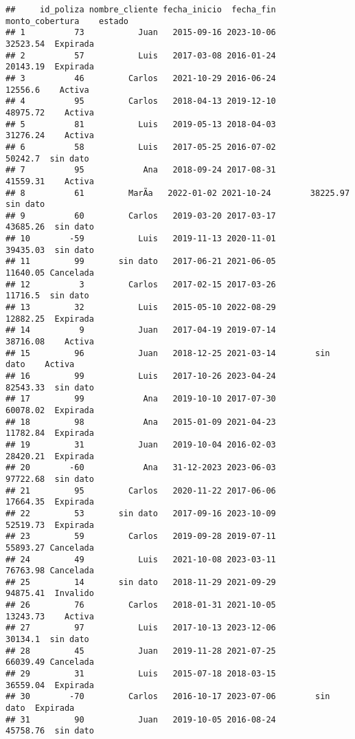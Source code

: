 \documentclass[
]{article}
\begin{document}
\begin{verbatim}
##     id_poliza nombre_cliente fecha_inicio  fecha_fin monto_cobertura    estado
## 1          73           Juan   2015-09-16 2023-10-06        32523.54  Expirada
## 2          57           Luis   2017-03-08 2016-01-24        20143.19  Expirada
## 3          46         Carlos   2021-10-29 2016-06-24         12556.6    Activa
## 4          95         Carlos   2018-04-13 2019-12-10        48975.72    Activa
## 5          81           Luis   2019-05-13 2018-04-03        31276.24    Activa
## 6          58           Luis   2017-05-25 2016-07-02         50242.7  sin dato
## 7          95            Ana   2018-09-24 2017-08-31        41559.31    Activa
## 8          61         MarÃ­a   2022-01-02 2021-10-24        38225.97  sin dato
## 9          60         Carlos   2019-03-20 2017-03-17        43685.26  sin dato
## 10        -59           Luis   2019-11-13 2020-11-01        39435.03  sin dato
## 11         99       sin dato   2017-06-21 2021-06-05        11640.05 Cancelada
## 12          3         Carlos   2017-02-15 2017-03-26         11716.5  sin dato
## 13         32           Luis   2015-05-10 2022-08-29        12882.25  Expirada
## 14          9           Juan   2017-04-19 2019-07-14        38716.08    Activa
## 15         96           Juan   2018-12-25 2021-03-14        sin dato    Activa
## 16         99           Luis   2017-10-26 2023-04-24        82543.33  sin dato
## 17         99            Ana   2019-10-10 2017-07-30        60078.02  Expirada
## 18         98            Ana   2015-01-09 2021-04-23        11782.84  Expirada
## 19         31           Juan   2019-10-04 2016-02-03        28420.21  Expirada
## 20        -60            Ana   31-12-2023 2023-06-03        97722.68  sin dato
## 21         95         Carlos   2020-11-22 2017-06-06        17664.35  Expirada
## 22         53       sin dato   2017-09-16 2023-10-09        52519.73  Expirada
## 23         59         Carlos   2019-09-28 2019-07-11        55893.27 Cancelada
## 24         49           Luis   2021-10-08 2023-03-11        76763.98 Cancelada
## 25         14       sin dato   2018-11-29 2021-09-29        94875.41  Invalido
## 26         76         Carlos   2018-01-31 2021-10-05        13243.73    Activa
## 27         97           Luis   2017-10-13 2023-12-06         30134.1  sin dato
## 28         45           Juan   2019-11-28 2021-07-25        66039.49 Cancelada
## 29         31           Luis   2015-07-18 2018-03-15        36559.04  Expirada
## 30        -70         Carlos   2016-10-17 2023-07-06        sin dato  Expirada
## 31         90           Juan   2019-10-05 2016-08-24        45758.76  sin dato

\end{verbatim}
\end{document}
